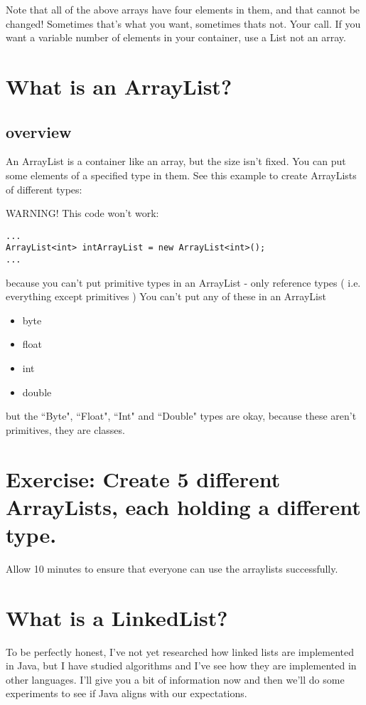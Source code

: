\documentclass[12pt]{article}
\begin{document}


Note that all of the above arrays have four elements in them, and that cannot be changed! Sometimes that's what you want, sometimes thats not. Your call. If you want a variable number of elements in your container, use a List not an array.

\section{What is an ArrayList?}
\subsection{overview}
An ArrayList is a container like an array, but the size isn't fixed. You can put some elements of a specified type in them. See this example to create ArrayLists of different types:



WARNING! This code won't work:
\begin{lstlisting}
...
ArrayList<int> intArrayList = new ArrayList<int>();
...
\end{lstlisting}

because you can't put primitive types in an ArrayList - only reference types ( i.e. everything except primitives )
You can't put any of these in an ArrayList

\begin{itemize}
\item byte
\item float
\item int
\item double
\end{itemize}

but the ``Byte", ``Float", ``Int" and ``Double" types are okay, because these aren't primitives, they are classes.


\section{Exercise: Create 5 different ArrayLists, each holding a different type.}

Allow 10 minutes to ensure that everyone can use the arraylists successfully.


\section{What is a LinkedList?}
To be perfectly honest, I've not yet researched how linked lists are implemented in Java, but I have studied algorithms and I've see how they are implemented in other languages. I'll give you a bit of information now and then we'll do some experiments to see if Java aligns with our expectations.
\end{document}

